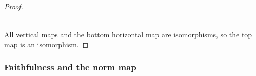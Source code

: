 \documentclass[english,svgnames,table]{article}
\begin{document}
\begin{proof}
\begin{equation*}
\begin{tikzcd}
            \end{tikzcd}
        \end{equation*}
        All vertical maps and the bottom horizontal map are isomorphisms, so the top map is an isomorphism.
    \end{proof}

    \subsubsection*{Faithfulness and the norm map}

\end{document}
